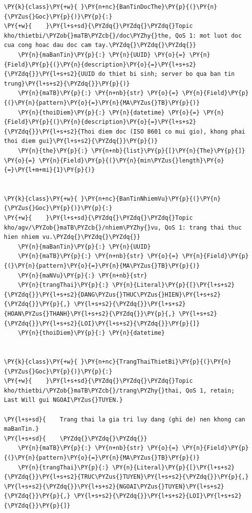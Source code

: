 \begin{Verbatim}[commandchars=\\\{\},frame=single,framerule=0.3pt,rulecolor=\color{black!40},fontsize=\footnotesize,breaklines=true]
\PY{k}{class}\PY{+w}{ }\PY{n+nc}{BanTinDocThe}\PY{p}{(}\PY{n}{\PYZus{}Goc}\PY{p}{)}\PY{p}{:}
\PY{+w}{    }\PY{l+s+sd}{\PYZdq{}\PYZdq{}\PYZdq{}Topic kho/thietbi/\PYZob{}maTB\PYZcb{}/doc\PYZhy{}the, QoS 1: mot luot doc cua cong hoac dau doc cam tay.\PYZdq{}\PYZdq{}\PYZdq{}}
    \PY{n}{maBanTin}\PY{p}{:} \PY{n}{UUID} \PY{o}{=} \PY{n}{Field}\PY{p}{(}\PY{n}{description}\PY{o}{=}\PY{l+s+s2}{\PYZdq{}}\PY{l+s+s2}{UUID do thiet bi sinh; server bo qua ban tin trung}\PY{l+s+s2}{\PYZdq{}}\PY{p}{)}
    \PY{n}{maTB}\PY{p}{:} \PY{n+nb}{str} \PY{o}{=} \PY{n}{Field}\PY{p}{(}\PY{n}{pattern}\PY{o}{=}\PY{n}{MA\PYZus{}TB}\PY{p}{)}
    \PY{n}{thoiDiem}\PY{p}{:} \PY{n}{datetime} \PY{o}{=} \PY{n}{Field}\PY{p}{(}\PY{n}{description}\PY{o}{=}\PY{l+s+s2}{\PYZdq{}}\PY{l+s+s2}{Thoi diem doc (ISO 8601 co mui gio), khong phai thoi diem gui}\PY{l+s+s2}{\PYZdq{}}\PY{p}{)}
    \PY{n}{the}\PY{p}{:} \PY{n+nb}{list}\PY{p}{[}\PY{n}{The}\PY{p}{]} \PY{o}{=} \PY{n}{Field}\PY{p}{(}\PY{n}{min\PYZus{}length}\PY{o}{=}\PY{l+m+mi}{1}\PY{p}{)}


\PY{k}{class}\PY{+w}{ }\PY{n+nc}{BanTinNhiemVu}\PY{p}{(}\PY{n}{\PYZus{}Goc}\PY{p}{)}\PY{p}{:}
\PY{+w}{    }\PY{l+s+sd}{\PYZdq{}\PYZdq{}\PYZdq{}Topic kho/agv/\PYZob{}maTB\PYZcb{}/nhiem\PYZhy{}vu, QoS 1: trang thai thuc hien nhiem vu.\PYZdq{}\PYZdq{}\PYZdq{}}
    \PY{n}{maBanTin}\PY{p}{:} \PY{n}{UUID}
    \PY{n}{maTB}\PY{p}{:} \PY{n+nb}{str} \PY{o}{=} \PY{n}{Field}\PY{p}{(}\PY{n}{pattern}\PY{o}{=}\PY{n}{MA\PYZus{}TB}\PY{p}{)}
    \PY{n}{maNVu}\PY{p}{:} \PY{n+nb}{str}
    \PY{n}{trangThai}\PY{p}{:} \PY{n}{Literal}\PY{p}{[}\PY{l+s+s2}{\PYZdq{}}\PY{l+s+s2}{DANG\PYZus{}THUC\PYZus{}HIEN}\PY{l+s+s2}{\PYZdq{}}\PY{p}{,} \PY{l+s+s2}{\PYZdq{}}\PY{l+s+s2}{HOAN\PYZus{}THANH}\PY{l+s+s2}{\PYZdq{}}\PY{p}{,} \PY{l+s+s2}{\PYZdq{}}\PY{l+s+s2}{LOI}\PY{l+s+s2}{\PYZdq{}}\PY{p}{]}
    \PY{n}{thoiDiem}\PY{p}{:} \PY{n}{datetime}


\PY{k}{class}\PY{+w}{ }\PY{n+nc}{TrangThaiThietBi}\PY{p}{(}\PY{n}{\PYZus{}Goc}\PY{p}{)}\PY{p}{:}
\PY{+w}{    }\PY{l+s+sd}{\PYZdq{}\PYZdq{}\PYZdq{}Topic kho/thietbi/\PYZob{}maTB\PYZcb{}/trang\PYZhy{}thai, QoS 1, retain; Last Will gui NGOAI\PYZus{}TUYEN.}

\PY{l+s+sd}{    Trang thai la gia tri luy dang (ghi de) nen khong can maBanTin.}
\PY{l+s+sd}{    \PYZdq{}\PYZdq{}\PYZdq{}}
    \PY{n}{maTB}\PY{p}{:} \PY{n+nb}{str} \PY{o}{=} \PY{n}{Field}\PY{p}{(}\PY{n}{pattern}\PY{o}{=}\PY{n}{MA\PYZus{}TB}\PY{p}{)}
    \PY{n}{trangThai}\PY{p}{:} \PY{n}{Literal}\PY{p}{[}\PY{l+s+s2}{\PYZdq{}}\PY{l+s+s2}{TRUC\PYZus{}TUYEN}\PY{l+s+s2}{\PYZdq{}}\PY{p}{,} \PY{l+s+s2}{\PYZdq{}}\PY{l+s+s2}{NGOAI\PYZus{}TUYEN}\PY{l+s+s2}{\PYZdq{}}\PY{p}{,} \PY{l+s+s2}{\PYZdq{}}\PY{l+s+s2}{LOI}\PY{l+s+s2}{\PYZdq{}}\PY{p}{]}



\end{Verbatim}
